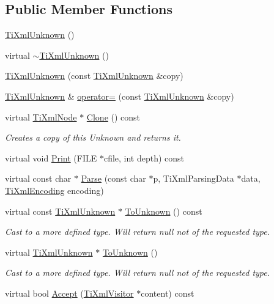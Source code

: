 \subsection*{Public Member Functions}
\begin{DoxyCompactItemize}
\item 
\hyperlink{class_ti_xml_unknown_a945f09b3c6538099c69fc563216750c3}{Ti\+Xml\+Unknown} ()
\item 
virtual \hyperlink{class_ti_xml_unknown_ac21966c3b551553d760b4a339c9acda0}{$\sim$\+Ti\+Xml\+Unknown} ()
\item 
\hyperlink{class_ti_xml_unknown_abe798ff4feea31474850c7f0de6bdf5e}{Ti\+Xml\+Unknown} (const \hyperlink{class_ti_xml_unknown}{Ti\+Xml\+Unknown} \&copy)
\item 
\hyperlink{class_ti_xml_unknown}{Ti\+Xml\+Unknown} \& \hyperlink{class_ti_xml_unknown_a60560b5aacb4bdc8b2b5f02f0a99c5c0}{operator=} (const \hyperlink{class_ti_xml_unknown}{Ti\+Xml\+Unknown} \&copy)
\item 
virtual \hyperlink{class_ti_xml_node}{Ti\+Xml\+Node} $\ast$ \hyperlink{class_ti_xml_unknown_a675c4b2684af35e4c7649b7fd5ae598d}{Clone} () const 
\begin{DoxyCompactList}\small\item\em Creates a copy of this Unknown and returns it. \end{DoxyCompactList}\item 
virtual void \hyperlink{class_ti_xml_unknown_a025f19c21ef01ea9be50febb8fe0ba06}{Print} (F\+I\+LE $\ast$cfile, int depth) const 
\item 
virtual const char $\ast$ \hyperlink{class_ti_xml_unknown_a0d0a0f8ec748f12bd1dc3ef6d64d7c87}{Parse} (const char $\ast$p, Ti\+Xml\+Parsing\+Data $\ast$data, \hyperlink{tinyxml_8h_a88d51847a13ee0f4b4d320d03d2c4d96}{Ti\+Xml\+Encoding} encoding)
\item 
virtual const \hyperlink{class_ti_xml_unknown}{Ti\+Xml\+Unknown} $\ast$ \hyperlink{class_ti_xml_unknown_ab0313e5fe77987d746ac1a97a254419d}{To\+Unknown} () const 
\begin{DoxyCompactList}\small\item\em Cast to a more defined type. Will return null not of the requested type. \end{DoxyCompactList}\item 
virtual \hyperlink{class_ti_xml_unknown}{Ti\+Xml\+Unknown} $\ast$ \hyperlink{class_ti_xml_unknown_a67c9fd22940e8c47f706a72cdd2e332c}{To\+Unknown} ()
\begin{DoxyCompactList}\small\item\em Cast to a more defined type. Will return null not of the requested type. \end{DoxyCompactList}\item 
virtual bool \hyperlink{class_ti_xml_unknown_a4e54d7482e05a837cf83c925cc683380}{Accept} (\hyperlink{class_ti_xml_visitor}{Ti\+Xml\+Visitor} $\ast$content) const 
\end{DoxyCompactItemize}
